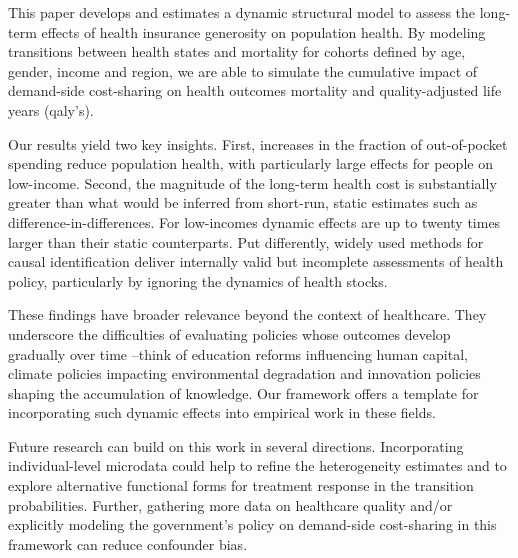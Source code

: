\documentclass[a4paper,12pt]{article}
\begin{document}
This paper develops and estimates a dynamic structural model to assess the long-term effects of health insurance generosity on population health. By modeling transitions between health states and mortality for cohorts defined by age, gender, income and region, we are able to simulate the cumulative impact of demand-side cost-sharing on health outcomes mortality and quality-adjusted life years (qaly's).

Our results yield two key insights. First, increases in the fraction of out-of-pocket spending reduce population health, with particularly large effects for people on low-income. Second, the magnitude of the long-term health cost is substantially greater than what would be inferred from short-run, static estimates such as difference-in-differences. For low-incomes dynamic effects are up to twenty times larger than their static counterparts. Put differently, widely used methods for causal identification deliver internally valid but incomplete assessments of health policy, particularly by ignoring the dynamics of health stocks.

These findings have broader relevance beyond the context of healthcare. They underscore the difficulties of evaluating policies whose outcomes develop gradually over time --think of education reforms influencing human capital, climate policies impacting environmental degradation and innovation policies shaping the accumulation of knowledge. Our framework offers a template for incorporating such dynamic effects into empirical work in these fields.

Future research can build on this work in several directions. Incorporating individual-level microdata could help to refine the heterogeneity estimates and to explore alternative functional forms for treatment response in the transition probabilities. Further, gathering more data on healthcare quality and/or explicitly modeling the government's policy on demand-side cost-sharing in this framework can reduce confounder bias.
\end{document}
